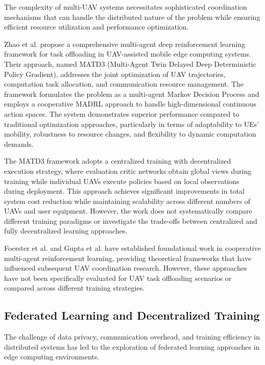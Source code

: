 \documentclass[journal]{IEEEtran}
\begin{document}
The complexity of multi-UAV systems necessitates sophisticated coordination mechanisms that can handle the distributed nature of the problem while ensuring efficient resource utilization and performance optimization.

Zhao et al. \cite{zhao2022multiagent} propose a comprehensive multi-agent deep reinforcement learning framework for task offloading in UAV-assisted mobile edge computing systems. Their approach, named MATD3 (Multi-Agent Twin Delayed Deep Deterministic Policy Gradient), addresses the joint optimization of UAV trajectories, computation task allocation, and communication resource management. The framework formulates the problem as a multi-agent Markov Decision Process and employs a cooperative MADRL approach to handle high-dimensional continuous action spaces. The system demonstrates superior performance compared to traditional optimization approaches, particularly in terms of adaptability to UEs' mobility, robustness to resource changes, and flexibility to dynamic computation demands.

The MATD3 framework adopts a centralized training with decentralized execution strategy, where evaluation critic networks obtain global views during training while individual UAVs execute policies based on local observations during deployment. This approach achieves significant improvements in total system cost reduction while maintaining scalability across different numbers of UAVs and user equipment. However, the work does not systematically compare different training paradigms or investigate the trade-offs between centralized and fully decentralized learning approaches.

Foerster et al. \cite{foerster2018counterfactual} and Gupta et al. \cite{gupta2017cooperative} have established foundational work in cooperative multi-agent reinforcement learning, providing theoretical frameworks that have influenced subsequent UAV coordination research. However, these approaches have not been specifically evaluated for UAV task offloading scenarios or compared across different training strategies.

\subsection{Federated Learning and Decentralized Training}

The challenge of data privacy, communication overhead, and training efficiency in distributed systems has led to the exploration of federated learning approaches in edge computing environments.
\end{document}
